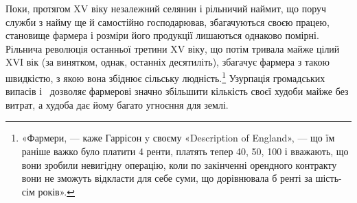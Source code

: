 Поки, протягом XV віку незалежний селянин і рільничий
наймит, що поруч служби з найму ще й самостійно господарював,
збагачуються своєю працею, становище фармера і розміри його
продукції лишаються однаково помірні. Рільнича революція
останньої третини XV віку, що потім тривала майже цілий XVI вік
(за винятком, однак, останніх десятиліть), збагачує фармера з
такою швидкістю, з якою вона збіднює сільську людність.\footnote{
«Фармери, — каже Гаррісон y своєму «Description of England», —
що їм раніше важко було платити 4 ренти, платять тепер 40, 50, 100 і вважають, що вони зробили невигідну операцію,
коли по закінченні орендного контракту вони не зможуть відкласти
для себе суми, що дорівнювала б ренті за шість-сім років».
}
Узурпація громадських випасів і~ дозволяє фармерові значно
збільшити кількість своєї худоби майже без витрат, а худоба дає
йому багато угноєння для землі.

